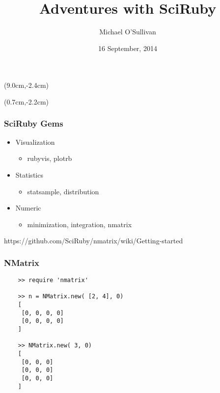 \documentclass[10pt]{beamer}
\title{Adventures with SciRuby}
\author[MOS]{Michael O'Sullivan}
\date{16 September, 2014}
\begin{document}

\begin{frame}
 \maketitle
\begin{textblock*}{2cm}(9.0cm,-2.4cm)
\end{textblock*}
\begin{textblock*}{2.0cm}(0.7cm,-2.2cm)
\end{textblock*}
\end{frame}


\begin{frame}
  \frametitle{SciRuby Gems}
  \begin{itemize}
      \item Visualization
      \begin{itemize}
        \item rubyvis, plotrb
      \end{itemize}
      \item Statistics
      \begin{itemize}
        \item statsample, distribution
      \end{itemize}
      \item Numeric
      \begin{itemize}
        \item minimization, integration, nmatrix
      \end{itemize}
  \end{itemize}

  \begin{shaded}
  https://github.com/SciRuby/nmatrix/wiki/Getting-started
  \end{shaded}
\end{frame}




\begin{frame}[fragile]
  \frametitle{NMatrix}
  \begin{verbatim}
    >> require 'nmatrix'

    >> n = NMatrix.new( [2, 4], 0)
    [
     [0, 0, 0, 0]
     [0, 0, 0, 0]
    ]

    >> NMatrix.new( 3, 0)
    [
     [0, 0, 0]
     [0, 0, 0]
     [0, 0, 0]
    ]
  \end{verbatim}
\end{frame}
\end{document}
